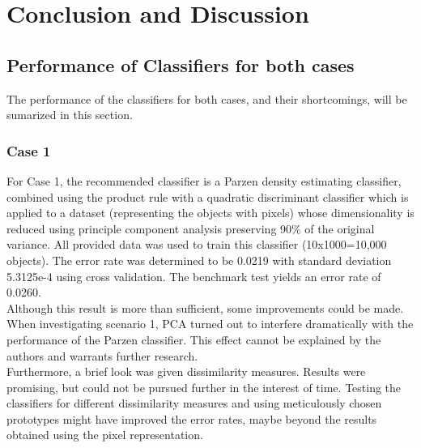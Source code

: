 \section{Conclusion and Discussion}
\label{sec:DiscConcl}
\subsection{Performance of Classifiers for both cases}
The performance of the classifiers for both cases, and their shortcomings, will be sumarized in this section. \\
\subsubsection*{Case 1}
For Case 1, the recommended classifier is a Parzen density estimating classifier, combined using the product rule with a quadratic discriminant classifier which is applied to a dataset (representing the objects with pixels) whose dimensionality is reduced using principle component analysis preserving 90\% of the original variance. All provided data was used to train this classifier (10x1000=10,000 objects). The error rate was determined to be 0.0219 with standard deviation 5.3125e-4 using cross validation. The benchmark test yields an error rate of 0.0260.\\
Although this result is more than sufficient, some improvements could be made. When investigating scenario 1, PCA turned out to interfere dramatically with the performance of the Parzen classifier. This effect cannot be explained by the authors and warrants further research. \\
Furthermore, a brief look was given dissimilarity measures. Results were promising, but could not be pursued further in the interest of time. Testing the classifiers for different dissimilarity measures and using meticulously chosen prototypes might have improved the error rates, maybe beyond the results obtained using the pixel representation. \\

